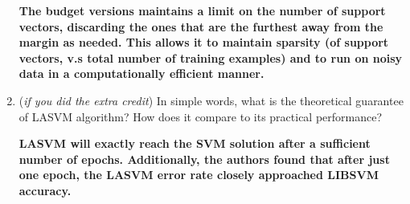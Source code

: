 \documentclass[submit]{harvardml}
\newenvironment{answer}{%
    \color{answergreen}\bf}
  {%
  }
\begin{document}
\begin{enumerate}
    \begin{answer}
        The budget versions maintains a limit on the number of support vectors, discarding the ones
        that are the furthest away from the margin as needed. This allows it to maintain sparsity
        (of support vectors, v.s total number of training examples) and to run on noisy data in a
        computationally efficient manner.
    \end{answer}
\item ({\em if you did the extra credit}) In simple words, what is the theoretical guarantee of LASVM algorithm? How does it compare to its practical performance?

    \begin{answer}
    LASVM will exactly reach the SVM solution after a sufficient number of epochs. Additionally, the
    authors found that after just one epoch, the LASVM error rate closely approached LIBSVM
    accuracy.
    \end{answer}

\end{enumerate}
\end{document}
